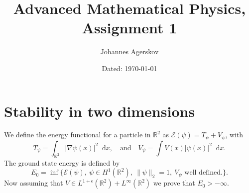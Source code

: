\documentclass[a4paper,11pt]{article}
\author{Johannes Agerskov}
\date{Dated: \today}
\title{Advanced Mathematical Physics, Assignment 1}
\newcommand*\diff{\mathop{}\!\mathrm{d}}
\newcommand{\R}{\mathbb{R}}
\numberwithin{equation}{section}
\begin{document}
	\maketitle

\section{Stability in two dimensions}
We define the energy functional for a particle in $ \R^2 $ as $ \mathcal{E}(\psi)=T_\psi+V_\psi $, with \begin{equation}
T_\psi=\int_{\R^2}\lvert\nabla\psi(x)\rvert^2 \diff x,\quad\text{and}\quad V_\psi=\int V(x)\lvert\psi(x)\rvert^2 \diff x.
\end{equation}
The ground state energy is defined by\begin{equation}
E_0=\inf\{\mathcal{E}(\psi),\ \psi\in H^1(\R^2),\ \lVert\psi\rVert_2=1,\ V_\psi \text{ well defined.}\}.
\end{equation} 
Now assuming that $ V\in L^{1+\epsilon}(\R^2)+L^\infty(\R^2) $ we prove that $ E_0>-\infty $.
\end{document}

